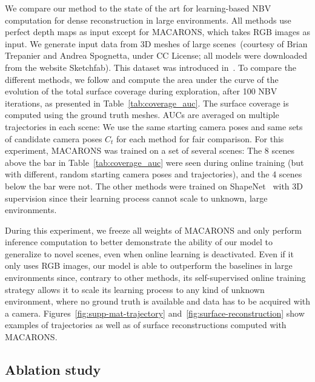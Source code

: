 
We compare our method to the state of the art for learning-based NBV computation for dense reconstruction in large environments. All methods use perfect depth maps as input except for MACARONS, which takes RGB images as input. We generate input data from 3D meshes of large scenes~(courtesy of Brian Trepanier and Andrea Spognetta, under CC License; all models were downloaded from the website Sketchfab). This dataset was introduced in~\cite{guedon-nips22-scone-surface-coverage}. To compare the different methods, we follow \cite{guedon-nips22-scone-surface-coverage} and compute the area under the curve of the evolution of the total surface coverage during exploration, after 100 NBV iterations, as presented in Table~\ref{tab:coverage_auc}. 
%
The surface coverage is computed using the ground truth meshes. AUCs are averaged on multiple trajectories in each scene: We use the same starting camera poses and same sets of candidate camera poses $C_t$ for each method for fair comparison. 
%
For this experiment, MACARONS was trained on a set of several scenes: The 8 scenes above the bar in Table~\ref{tab:coverage_auc} were seen during online training (but with different, random starting camera poses and trajectories), and the 4 scenes below the bar were not. The other methods were trained on ShapeNet~\cite{chang-15-shapenet} with 3D supervision since their learning process cannot scale to unknown, large environments.

During this experiment, we freeze all weights of MACARONS and only perform inference computation to better demonstrate the ability of our model to generalize to novel scenes, even when online learning is deactivated.
%
Even if it only uses RGB images, our model is able to outperform the baselines in large environments since, contrary to other methods, its self-supervised online training strategy allows it to scale its learning process to any kind of unknown environment, where no ground truth is available and data has to be acquired with a camera.
%
Figures~\ref{fig:supp-mat-trajectory} %
and~\ref{fig:surface-reconstruction} show examples of trajectories as well as of surface reconstructions computed with MACARONS.

\subsection{Ablation study}



